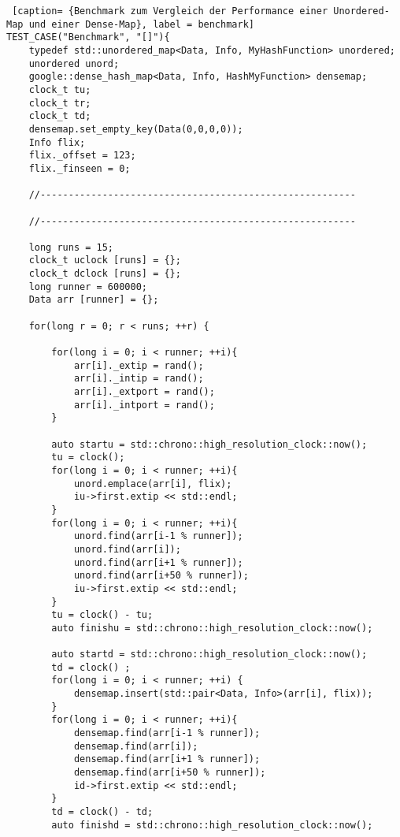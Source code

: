 \documentclass[../review_3.tex]{subfiles}
\begin{document}
\begin{lstlisting} [caption= {Benchmark zum Vergleich der Performance einer Unordered-Map und einer Dense-Map}, label = benchmark]
TEST_CASE("Benchmark", "[]"){
    typedef std::unordered_map<Data, Info, MyHashFunction> unordered;
    unordered unord;
    google::dense_hash_map<Data, Info, HashMyFunction> densemap;
    clock_t tu;
    clock_t tr;
    clock_t td;
    densemap.set_empty_key(Data(0,0,0,0));
    Info flix;
    flix._offset = 123;
    flix._finseen = 0;
    
    //--------------------------------------------------------
    
    //--------------------------------------------------------
    
    long runs = 15; 
    clock_t uclock [runs] = {}; 
    clock_t dclock [runs] = {}; 
    long runner = 600000; 
    Data arr [runner] = {}; 
    
    for(long r = 0; r < runs; ++r) {
        
        for(long i = 0; i < runner; ++i){
            arr[i]._extip = rand(); 
            arr[i]._intip = rand(); 
            arr[i]._extport = rand(); 
            arr[i]._intport = rand(); 
        }   
        
        auto startu = std::chrono::high_resolution_clock::now();
        tu = clock(); 
        for(long i = 0; i < runner; ++i){
            unord.emplace(arr[i], flix);
            iu->first.extip << std::endl; 
        }
        for(long i = 0; i < runner; ++i){
            unord.find(arr[i-1 % runner]);
            unord.find(arr[i]);
            unord.find(arr[i+1 % runner]);
            unord.find(arr[i+50 % runner]);
            iu->first.extip << std::endl; 
        }
        tu = clock() - tu; 
        auto finishu = std::chrono::high_resolution_clock::now();
        
        auto startd = std::chrono::high_resolution_clock::now();
        td = clock() ; 
        for(long i = 0; i < runner; ++i) {
            densemap.insert(std::pair<Data, Info>(arr[i], flix));  
        }
        for(long i = 0; i < runner; ++i){
            densemap.find(arr[i-1 % runner]);
            densemap.find(arr[i]);
            densemap.find(arr[i+1 % runner]);
            densemap.find(arr[i+50 % runner]);
            id->first.extip << std::endl; 
        }
        td = clock() - td; 
        auto finishd = std::chrono::high_resolution_clock::now();
        

\end{lstlisting}
\end{document}
